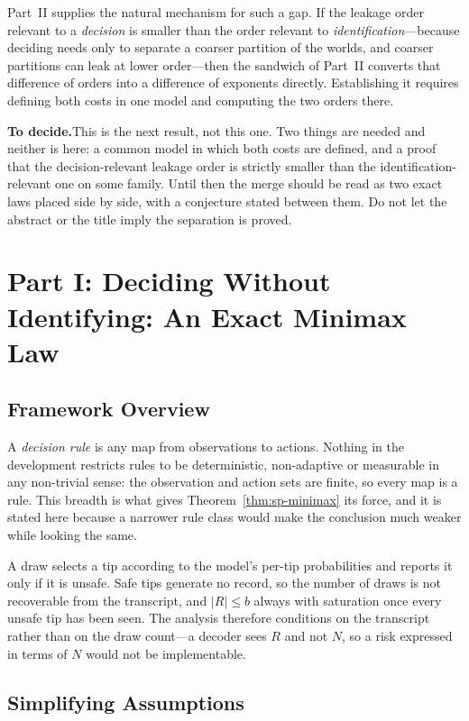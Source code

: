 \documentclass[conference]{IEEEtran}
\theoremstyle{definition}
\newif\ifshownotes\shownotestrue
\newcommand{\TODOPAR}[1]{\ifshownotes\par\vspace{2pt}\noindent%
  {\color{todocol}\textsf{\footnotesize\textbf{To decide.}\;#1}}\par\vspace{2pt}\fi}
\begin{document}
Part~II supplies the natural mechanism for such a gap. If the leakage order relevant to a
\emph{decision} is smaller than the order relevant to \emph{identification}---because
deciding needs only to separate a coarser partition of the worlds, and coarser partitions can
leak at lower order---then the sandwich of Part~II converts that difference of orders into a
difference of exponents directly. Establishing it requires defining both costs in one model
and computing the two orders there.

\TODOPAR{This is the next result, not this one. Two things are needed and neither is here: a
common model in which both costs are defined, and a proof that the decision-relevant leakage
order is strictly smaller than the identification-relevant one on some family. Until then the
merge should be read as two exact laws placed side by side, with a conjecture stated between
them. Do not let the abstract or the title imply the separation is proved.}

\section{Part I: Deciding Without Identifying: An Exact Minimax Law}

\label{sec:sp-setting}

\subsection{Framework Overview}

A \emph{decision rule} is any map from observations to actions. Nothing in the development
restricts rules to be deterministic, non-adaptive or measurable in any non-trivial sense: the
observation and action sets are finite, so every map is a rule. This breadth is what gives
Theorem~\ref{thm:sp-minimax} its force, and it is stated here because a narrower rule class would
make the conclusion much weaker while looking the same.

A draw selects a tip according to the model's per-tip probabilities and reports it only if it
is unsafe. Safe tips generate no record, so the number of draws is not recoverable from the
transcript, and $|R|\le b$ always with saturation once every unsafe tip has been seen. The
analysis therefore conditions on the transcript rather than on the draw count---a decoder sees
$R$ and not $N$, so a risk expressed in terms of $N$ would not be implementable.

\subsection{Simplifying Assumptions}
\end{document}
